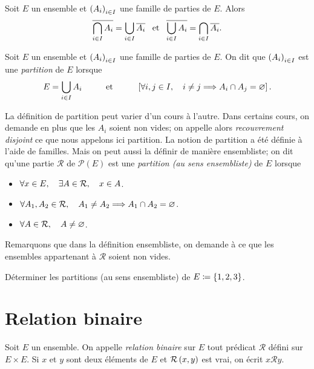 \documentclass{magnolia}
\begin{document}
\begin{proposition}[utile=-3]
Soit $E$ un ensemble et $\left(A_i\right)_{i\in I}$ une famille de parties de $E$. Alors
\[\overline{\bigcap\limits_{i\in I} A_i}=\bigcup\limits_{i\in I} \overline{A_i} \quad\!\text{et}\quad\!
  \overline{\bigcup\limits_{i\in I} A_i}=\bigcap\limits_{i\in I} \overline{A_i}.\]
\end{proposition}

\begin{definition}[utile=-3, nom=Partition]
Soit $E$ un ensemble et $\left(A_i\right)_{i\in I}$ une famille de parties de $E$.
On dit que $\left(A_i\right)_{i\in I}$ est une \emph{partition} de $E$ lorsque
\[E = \bigcup_{i\in I} A_i \qquad\quad\!\text{et}\quad\!\qquad \left[\forall i,j\in I,\quad i\neq j\Longrightarrow
  A_i\cap A_j=\varnothing\right].\]
\end{definition}

\begin{remarques}
\remarque La définition de partition peut varier d'un cours à l'autre.
  Dans certains cours, on demande en plus que les $A_i$ soient non vides; on appelle
  alors \emph{recouvrement disjoint} ce que nous appelons ici partition.
\remarque La notion de partition a été définie à l'aide de familles. Mais on peut aussi
  la définir de manière ensembliste; on dit qu'une partie $\mathcal{R}$ de
  $\mathcal{P}(E)$ est une \emph{partition (au sens ensembliste)} de $E$ lorsque  
  \begin{itemize}
  \item $\forall x\in E,\quad \exists A\in\mathcal{R},\quad x\in A$.
  \item $\forall A_1, A_2\in\mathcal{R},\quad A_1\neq A_2\Longrightarrow A_1\cap A_2=\varnothing$.
  \item $\forall A\in\mathcal{R},\quad A\neq\varnothing$. 
  \end{itemize}
  Remarquons que dans la définition ensembliste, on demande à ce que les ensembles appartenant à $\mathcal{R}$
  soient non vides.
\end{remarques}

\begin{exoUnique}
\exo Déterminer les partitions (au sens ensembliste) de $E\coloneqq\left\{1,2,3\right\}$.
\end{exoUnique}

\section{Relation binaire}

\begin{definition}[utile=-3]
Soit $E$ un ensemble. On appelle \emph{relation binaire} sur $E$ tout prédicat
$\mathcal{R}$ défini sur $E\times E$. Si $x$ et $y$ sont deux
éléments de $E$ et $\mathcal{R}\left(x,y\right)$ est vrai, on écrit $x\mathcal{R} y$.
\end{definition}
\end{document}
